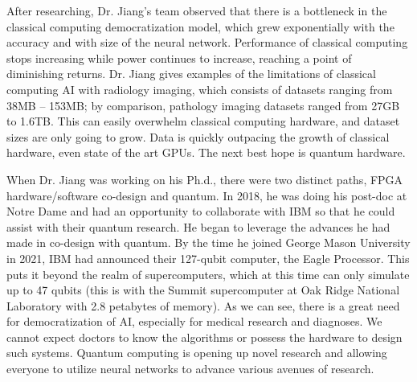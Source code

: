 \documentclass[11pt]{article}
\begin{document}
After researching, Dr. Jiang's team observed that there is a bottleneck in the classical computing democratization model, which grew exponentially with the accuracy and with size of the neural network. Performance of classical computing stops increasing while power continues to increase, reaching a point of diminishing returns. Dr. Jiang gives examples of the limitations of classical computing AI with radiology imaging, which consists of datasets ranging from 38MB -- 153MB; by comparison, pathology imaging datasets ranged from 27GB to 1.6TB. This can easily overwhelm classical computing hardware, and dataset sizes are only going to grow. Data is quickly outpacing the growth of classical hardware, even state of the art GPUs. The next best hope is quantum hardware.

When Dr. Jiang was working on his Ph.d., there were two distinct paths, FPGA hardware/software co-design and quantum. In 2018, he was doing his post-doc at Notre Dame and had an opportunity to collaborate with IBM so that he could assist with their quantum research. He began to leverage the advances he had made in co-design with quantum. By the time he joined George Mason University in 2021, IBM had announced their 127-qubit computer, the Eagle Processor. This puts it beyond the realm of supercomputers, which at this time can only simulate up to 47 qubits (this is with the Summit supercomputer at Oak Ridge National Laboratory with 2.8 petabytes of memory). As we can see, there is a great need for democratization of AI, especially for medical research and diagnoses. We cannot expect doctors to know the algorithms or possess the hardware to design such systems. Quantum computing is opening up novel research and allowing everyone to utilize neural networks to advance various avenues of research.



\end{document}
